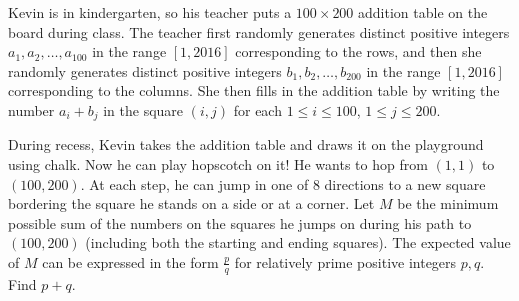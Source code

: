 Kevin is in kindergarten, so his teacher puts a $100 \times 200$ addition table on the board during class. The teacher first randomly generates distinct positive integers $a_1, a_2, \dots, a_{100}$ in the range $[1, 2016]$ corresponding to the rows, and then she randomly generates distinct positive integers $b_1, b_2, \dots, b_{200}$ in the range $[1, 2016]$ corresponding to the columns. She then fills in the addition table by writing the number $a_i+b_j$ in the square $(i, j)$ for each $1\le i\le 100$, $1\le j\le 200$.

During recess, Kevin takes the addition table and draws it on the playground using chalk. Now he can play hopscotch on it! He wants to hop from $(1, 1)$ to $(100, 200)$. At each step, he can jump in one of $8$ directions to a new square bordering the square he stands on a side or at a corner. Let $M$ be the minimum possible sum of the numbers on the squares he jumps on during his path to $(100, 200)$ (including both the starting and ending squares). The expected value of $M$ can be expressed in the form $\frac{p}{q}$ for relatively prime positive integers $p, q$. Find $p + q.$
